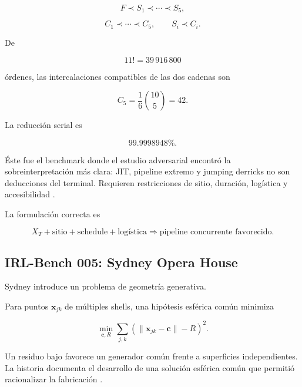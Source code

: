 \begin{equation}
F\prec S_1\prec\cdots\prec S_5,
\end{equation}

\begin{equation}
C_1\prec\cdots\prec C_5,
\qquad
S_i\prec C_i.
\end{equation}

De

\begin{equation}
11!=39\,916\,800
\end{equation}

órdenes, las intercalaciones compatibles de las dos cadenas son

\begin{equation}
C_5
=
\frac1{6}{10\choose5}
=
42.
\end{equation}

La reducción serial es

\begin{equation}
99.9998948\%.
\end{equation}

Éste fue el benchmark donde el estudio adversarial encontró la sobreinterpretación más clara: JIT, pipeline extremo y jumping derricks no son deducciones del terminal. Requieren restricciones de sitio, duración, logística y accesibilidad \cite{esbhistory,locempire,skyscrapermuseum,smithsonianderrick}.

La formulación correcta es

\begin{equation}
\boxed{
X_T
+
\text{sitio}
+
\text{schedule}
+
\text{logística}
\Rightarrow
\text{pipeline concurrente favorecido}.
}
\end{equation}

\subsection{IRL-Bench 005: Sydney Opera House}

Sydney introduce un problema de geometría generativa.

Para puntos \(\mathbf x_{jk}\) de múltiples shells, una hipótesis esférica común minimiza

\begin{equation}
\boxed{
\min_{\mathbf c,R}
\sum_{j,k}
\left(
\|\mathbf x_{jk}-\mathbf c\|-R
\right)^2.
}
\end{equation}

Un residuo bajo favorece un generador común frente a superficies independientes. La historia documenta el desarrollo de una solución esférica común que permitió racionalizar la fabricación \cite{sydneysphere,arupsydney,heritagesydney,istructesydney}.

